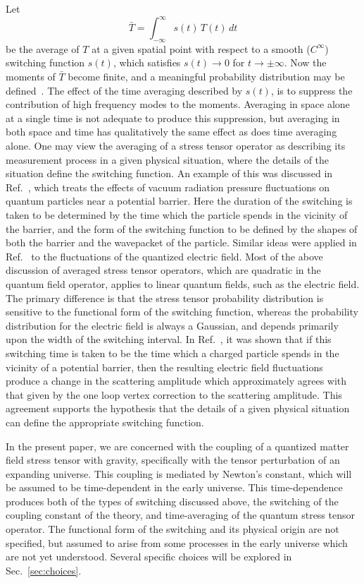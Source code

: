 \documentclass[preprint,prd,showpacs,superscriptaddress]{revtex4}
\begin{document}
Let
\begin{equation}\label{E:aver}
\bar{T} = \int_{-\infty}^\infty s(t) \, T(t)\, dt 
\end{equation}
be the average of $T$ at a given spatial point with respect to a smooth ($C^\infty$) switching function $s(t)$, which satisfies
$s(t) \rightarrow 0$ for $t  \rightarrow \pm \infty$. Now the moments of $\bar{T}$ become finite, and a meaningful probability 
distribution may be defined~\cite{FFR10,FFR12,FF15}. The effect of the time averaging described by  $s(t)$, is to
suppress the contribution of high frequency modes to the moments. Averaging in space alone at a single time is not adequate
to produce this suppression, but averaging in both space and time has qualitatively the same effect as does time averaging alone.
One may view the averaging of a stress tensor operator as describing its measurement process in a given physical situation,
where the details of the situation define the switching function. An example of this was discussed in Ref.~\cite{HF16}, which
treats the effects of vacuum radiation pressure fluctuations on quantum particles near a potential barrier. Here the duration
of the switching is taken to be determined by the time which the particle spends in the vicinity of the barrier, and the form of the
switching function to be defined by the shapes of both the barrier and the wavepacket of the particle. Similar ideas were
applied in Ref.~\cite{HF15} to the fluctuations of the quantized electric field. Most of the above discussion of averaged stress
tensor operators, which are quadratic in the quantum field operator, applies to linear quantum fields, such as the electric field.
The primary difference is that the stress tensor probability distribution is sensitive to the functional form of the switching
function, whereas the probability distribution for the electric field is always a Gaussian, and depends primarily upon the
width of the switching interval. In Ref.~\cite{HF15}, it was shown that if this switching time is taken to be the time which a charged
particle spends in the vicinity of a potential barrier, then the resulting electric field fluctuations produce a change in
the scattering amplitude which approximately agrees with that given by the one loop vertex correction to the scattering amplitude. 
This agreement supports the hypothesis that the
details of a given physical situation can define the appropriate switching function.

In the present paper, we are concerned with the coupling of a quantized matter field stress tensor with gravity, specifically with the tensor
perturbation of an expanding universe. This coupling is mediated by Newton's constant, which will be assumed to be time-dependent
in the early universe. This time-dependence produces both of the types of switching discussed above, the switching of the coupling
constant of the theory, and time-averaging of the quantum stress tensor operator. The functional form of the switching and its
physical origin are not  specified, but assumed to arise from some processes in the early universe which are not yet understood.
Several specific choices will be explored in Sec.~\ref{sec:choices}.
\end{document}
